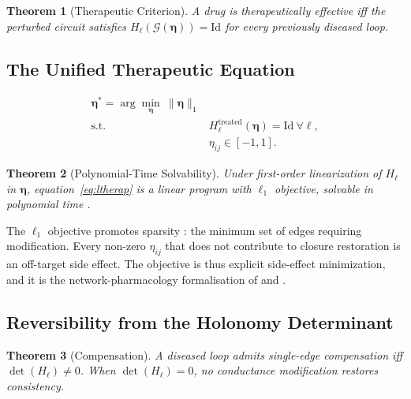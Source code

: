 \documentclass[twocolumn,10pt,a4paper]{article}
\newtheorem{theorem}{Theorem}[section]
\theoremstyle{definition}
\theoremstyle{remark}
\newcommand{\Gcond}{\mathcal{G}}
\newcommand{\Hol}{H}
\begin{document}
\begin{theorem}[Therapeutic Criterion]
A drug is therapeutically effective iff the perturbed circuit satisfies $\Hol_\ell(\Gcond(\boldsymbol{\eta})) = \mathrm{Id}$ for every previously diseased loop.
\end{theorem}

\subsection{The Unified Therapeutic Equation}

\begin{tcolorbox}
\begin{equation}
\begin{aligned}
    \boldsymbol{\eta}^* = \arg\min_{\boldsymbol{\eta}}\ \|\boldsymbol{\eta}\|_1\\
    \text{s.t.}\quad &\Hol_\ell^{\mathrm{treated}}(\boldsymbol{\eta}) = \mathrm{Id}\ \forall\ell,\\
    &\eta_{ij}\in[-1,1].
\end{aligned}
\label{eq:ltherap}
\end{equation}
\end{tcolorbox}

\begin{theorem}[Polynomial-Time Solvability]
Under first-order linearization of $\Hol_\ell$ in $\boldsymbol{\eta}$, equation~\eqref{eq:ltherap} is a linear program with $\ell_1$ objective, solvable in polynomial time \citep{dantzig_1963,karmarkar_1984}.
\end{theorem}

The $\ell_1$ objective promotes sparsity \citep{tibshirani_1996,candes_tao_2005,donoho_2006,candes_romberg_tao_2006}: the minimum set of edges requiring modification. Every non-zero $\eta_{ij}$ that does not contribute to closure restoration is an off-target side effect. The objective is thus explicit side-effect minimization, and it is the network-pharmacology formalisation of \citet{hopkins_2008} and \citet{yildirim_2007}.

\subsection{Reversibility from the Holonomy Determinant}

\begin{theorem}[Compensation]
A diseased loop admits single-edge compensation iff $\det(\Hol_\ell)\neq 0$. When $\det(\Hol_\ell) = 0$, no conductance modification restores consistency.
\end{theorem}
\end{document}
